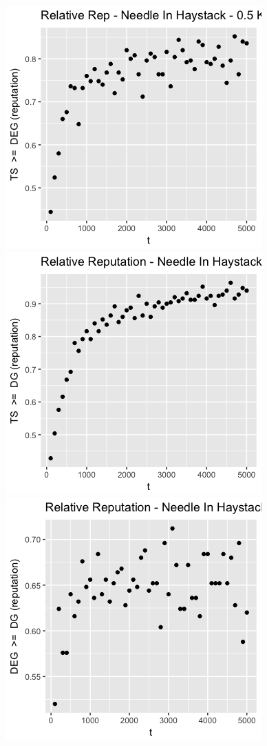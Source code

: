 \documentclass[11pt,letterpaper]{article}
\begin{document}
\includegraphics[scale=0.5]{ts_deg_nih_3_prelim} \\
\includegraphics[scale=0.5]{ts_dg_nih_3_prelim} \\
\includegraphics[scale=0.5]{deg_dg_nih_3_prelim} \\
\end{document}

